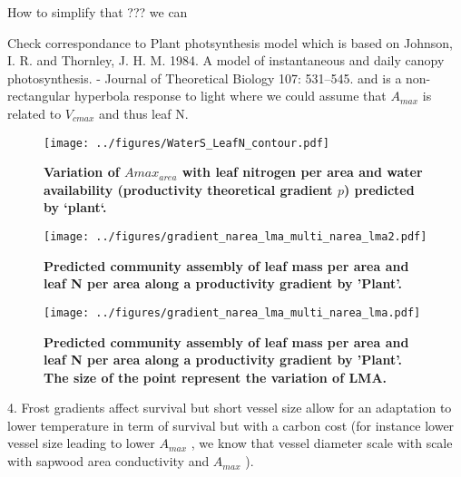 \documentclass[a4paper,11pt]{article}
\begin{document}
How to simplify that ??? we can


Check correspondance to Plant photsynthesis model which is based on Johnson, I. R. and Thornley, J. H. M. 1984. A model of instantaneous and daily canopy photosynthesis. - Journal of Theoretical Biology 107: 531–545.
 and is a non-rectangular hyperbola response to light where we could assume that $A_{max}$ is related to $V_{cmax}$ and thus leaf N.





\begin{figure}[ht]
\centering
\texttt{[image: ../figures/WaterS\_LeafN\_contour.pdf]}
\caption{\textbf{Variation of $A{max}_{area}$ with leaf nitrogen per area and water availability (productivity theoretical gradient $p$) predicted by `plant`.}
\label{fig:leafN_water}}
\end{figure}


\begin{figure}[ht]
\centering
\texttt{[image: ../figures/gradient\_narea\_lma\_multi\_narea\_lma2.pdf]}
\caption{\textbf{Predicted community assembly of leaf mass per area and leaf N per area along a productivity gradient by 'Plant'.}
\label{fig:lma_mat_o_map}}
\end{figure}

\begin{figure}[ht]
\centering
\texttt{[image: ../figures/gradient\_narea\_lma\_multi\_narea\_lma.pdf]}
\caption{\textbf{Predicted community assembly of leaf mass per area and leaf N per area along a productivity gradient by 'Plant'. The size of the point represent the variation of LMA.}
\label{fig:lma_mat_o_map}}
\end{figure}

\clearpage

4. Frost gradients affect survival but
short vessel size allow for an adaptation to lower temperature in term
of survival but
with a carbon cost (for instance lower vessel size leading to lower
$A_{max}$ \citep{Poorter-2010}, we know that vessel diameter scale with scale with sapwood area conductivity and $A_{max}$ \citep{Chen-2009,Choat-2011}).
\end{document}
